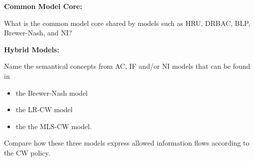 \documentclass[10pt]{exam}  %
\begin{document}
\begin{questions}
    \question \textbf{Common Model Core:}\hfill

    What is the common model core shared by models such as HRU, DRBAC, BLP, Brewer-Nash, and NI?
    \begin{solution}
    \end{solution}

    \question \textbf{Hybrid Models:}\hfill

    Name the semantical concepts from AC, IF and/or NI models that can be found in
    \begin{itemize}
        \item the Brewer-Nash model
        \item the LR-CW model
        \item the the MLS-CW model.
    \end{itemize}
    Compare how these three models express allowed information flows according to the CW policy.
    \begin{solution}
    \end{solution}

\end{questions}
\end{document}
